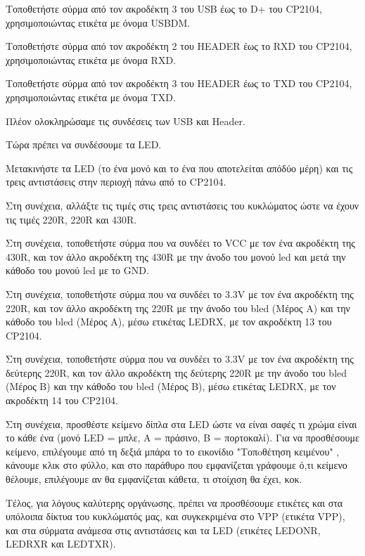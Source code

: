 \documentclass[a4paper]{article}
\begin{document}
Τοποθετήστε σύρμα από τον ακροδέκτη 3 του USB έως το D+ του CP2104, χρησιμοποιώντας ετικέτα με όνομα USBDM.

Τοποθετήστε σύρμα από τον ακροδέκτη 2 του HEADER έως το RXD του CP2104, χρησιμοποιώντας ετικέτα με όνομα RXD.

Τοποθετήστε σύρμα από τον ακροδέκτη 3 του HEADER έως το TXD του CP2104, χρησιμοποιώντας ετικέτα με όνομα TXD.

Πλέον ολοκληρώσαμε τις συνδέσεις των USB και Header.

Τώρα πρέπει να συνδέσουμε τα LED. 

Μετακινήστε τα LED (το ένα μονό και το ένα που αποτελείται απόδύο μέρη) και τις τρεις αντιστάσεις στην περιοχή πάνω από το CP2104.

Στη συνέχεια, αλλάξτε τις τιμές στις τρεις αντιστάσεις του κυκλώματος ώστε να έχουν τις τιμές 220R, 220R και 430R.

Στη συνέχεια, τοποθετήστε σύρμα που να συνδέει το VCC με τον ένα ακροδέκτη της 430R, και τον άλλο ακροδέκτη της 430R με την άνοδο του μονού led και μετά την κάθοδο του μονού led με το GND.

Στη συνέχεια, τοποθετήστε σύρμα που να συνδέει το 3.3V με τον ένα ακροδέκτη της 220R, και τον άλλο ακροδέκτη της 220R με την άνοδο του bled (Μέρος Α) και την κάθοδο του bled (Μέρος Α), μέσω ετικέτας LEDRX, με τον ακροδέκτη 13 του CP2104.

Στη συνέχεια, τοποθετήστε σύρμα που να συνδέει το 3.3V με τον ένα ακροδέκτη της δεύτερης 220R, και τον άλλο ακροδέκτη της δεύτερης 220R με την άνοδο του bled (Μέρος Β) και την κάθοδο του bled (Μέρος Β), μέσω ετικέτας LEDRX, με τον ακροδέκτη 14 του CP2104.

Στη συνέχεια, προσθέστε κείμενο δίπλα στα LED ώστε να είναι σαφές τι χρώμα είναι το κάθε ένα (μονό LED = μπλε, A = πράσινο, B = πορτοκαλί). Για να προσθέσουμε κείμενο, επιλέγουμε από τη δεξιά μπάρα το το εικονίδιο "Τοπoθέτηση κειμένου" %
, κάνουμε κλικ στο φύλλο, και στο παράθυρο που εμφανίζεται γράφουμε ό,τι κείμενο θέλουμε, επιλέγουμε αν θα εμφανίζεται κάθετα, τι στοίχιση θα έχει, κοκ.

\begin{figure}
  \begin{center}
    \label{fig:kicad-main}
  \end{center}
\end{figure}

Τέλος, για λόγους καλύτερης οργάνωσης, πρέπει να προσθέσουμε ετικέτες και στα υπόλοιπα δίκτυα του κυκλώματός μας, και συγκεκριμένα στο VPP (ετικέτα VPP), και στα σύρματα ανάμεσα στις αντιστάσεις και τα LED (ετικέτες LEDONR, LEDRXR και LEDTXR).
\end{document}
